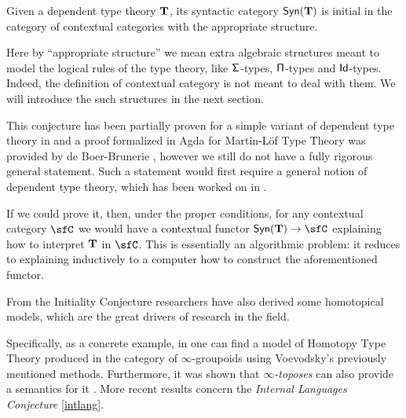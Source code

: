 \begin{initiality}\label{initconj}
  Given a dependent type theory $\operatorname{\mathbf{T}}$, its syntactic category $\mathsf{Syn}(\mathbf{\operatorname{\mathbf{T}}})$ is
  initial in the category of contextual categories with the appropriate
  structure.
\end{initiality}

\begin{rmk}
Here by ``appropriate structure'' we mean extra algebraic structures meant to
model the
logical rules of the type theory, like $\operatorname{\mathsf{\Sigma}}$-types, $\operatorname{\mathsf{\Pi}}$-types and
$\operatorname{\mathsf{Id}}$-types. Indeed, the definition of contextual category is not meant to deal
with them. We will introduce the such structures in the next section.
\end{rmk}

\begin{rmk}
This conjecture has been partially proven for a simple variant of dependent type
theory in \cite{Str91} and a proof formalized in Agda
for Martin-L\"{o}f Type Theory was provided by de Boer-Brunerie
\cite{Boe20}, however we still do not have a fully
rigorous general statement. Such a statement would first require a general
notion of dependent type theory,
which has been worked on in \cite{Isa17, Uem19, Bru20, BHL20, NU22}.
\end{rmk}

\noindent
If we could prove it, then, under the proper conditions,
for any contextual category $\sfC$ we would have a
contextual functor $\Syn{\T}\rightarrow\sfC$ explaining how to interpret $\operatorname{\mathbf{T}}$ in
$\sfC$. This is essentially an algorithmic problem: it reduces to explaining
inductively to a computer how to construct the aforementioned functor.

\begin{rmk}\label{internal}
  From the Initiality Conjecture researchers have also derived some homotopical
  models, which are the great drivers
  of research in the field.

  \noindent
  Specifically, as a concrete example, in \cite{KL12} one can find a model of
  Homotopy Type Theory produced in the category of $\infty$-groupoids using
  Voevodsky's previously mentioned methods.
  Furthermore, it was shown that \emph{$\infty$-toposes} can also provide a
  semantics for it \cite{Shu19}. More recent results concern the \emph{Internal
  Languages Conjecture} \ref{intlang}.
\end{rmk}

